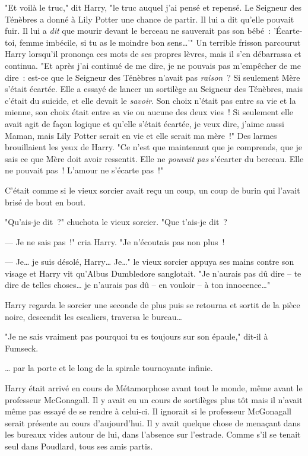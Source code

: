 "Et voilà le truc," dit Harry, "le truc auquel j'ai pensé et repensé. Le Seigneur des Ténèbres a donné à Lily Potter une chance de partir. Il lui a dit qu'elle pouvait fuir. Il lui a \emph{dit} que mourir devant le berceau ne sauverait pas son bébé~: 'Écarte-toi, femme imbécile, si tu as le moindre bon sens…'" Un terrible frisson parcourut Harry lorsqu'il prononça ces mots de ses propres lèvres, mais il s'en débarrassa et continua. "Et après j'ai continué de me dire, je ne pouvais pas m'empêcher de me dire~: est-ce que le Seigneur des Ténèbres n'avait pas \emph{raison}~? Si seulement Mère s'était écartée. Elle a essayé de lancer un sortilège au Seigneur des Ténèbres, mais c'était du suicide, et elle devait le \emph{savoir}. Son choix n'était pas entre sa vie et la mienne, son choix était entre sa vie ou aucune des deux vies~! Si seulement elle avait agit de façon logique et qu'elle s'était écartée, je veux dire, j'aime aussi Maman, mais Lily Potter serait en vie et elle serait ma mère~!" Des larmes brouillaient les yeux de Harry. "Ce n'est que maintenant que je comprends, que je sais ce que Mère doit avoir ressentit. Elle ne \emph{pouvait pas} s'écarter du berceau. Elle ne pouvait pas~! L'amour ne s'écarte pas~!"

C'était comme si le vieux sorcier avait reçu un coup, un coup de burin qui l'avait brisé de bout en bout.

"Qu'ais-je dit~?" chuchota le vieux sorcier. "Que t'ais-je dit~?

--- Je ne sais pas~!" cria Harry. "Je n'écoutais pas non plus~!

--- Je… je suis désolé, Harry… Je…" le vieux sorcier appuya ses mains contre son visage et Harry vit qu'Albus Dumbledore sanglotait. "Je n'aurais pas dû dire -- te dire de telles choses… je n'aurais pas dû -- en vouloir -- à ton innocence…"

Harry regarda le sorcier une seconde de plus puis se retourna et sortit de la pièce noire, descendit les escaliers, traversa le bureau…

"Je ne sais vraiment pas pourquoi tu es toujours sur son épaule," dit-il à Fumseck.

… par la porte et le long de la spirale tournoyante infinie.

\later

Harry était arrivé en cours de Métamorphose avant tout le monde, même avant le professeur McGonagall. Il y avait eu un cours de sortilèges plus tôt mais il n'avait même pas essayé de se rendre à celui-ci. Il ignorait si le professeur McGonagall serait présente au cours d'aujourd'hui. Il y avait quelque chose de menaçant dans les bureaux vides autour de lui, dans l'absence sur l'estrade. Comme s'il se tenait seul dans Poudlard, tous ses amis partis.

